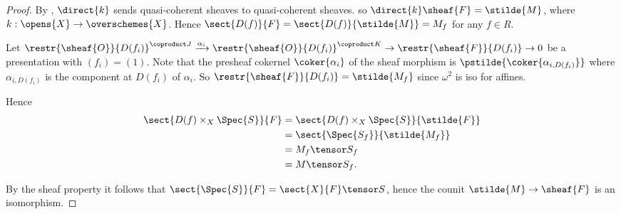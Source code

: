 \begin{proof}
By , $\direct{k}$ sends quasi-coherent sheaves to quasi-coherent sheaves.
so $\direct{k}\sheaf{F} = \stilde{M}$,
where $k:\opens{X} \rightarrow \overschemes{X}$.
Hence $\sect{D(f)}{F} = \sect{D(f)}{\stilde{M}} = M_f$ 
for any $f\in R$.

Let 
$\restr{\sheaf{O}}{D(f_i)}^{\coproduct J} \xrightarrow{\alpha_i} \restr{\sheaf{O}}{D(f_i)}^{\coproduct K} \rightarrow \restr{\sheaf{F}}{D(f_i)} \rightarrow 0$ be a presentation with $(f_i) = (1)$.
Note that the presheaf cokernel $\coker{\alpha_i}$ of the sheaf morphism is
$\pstilde{\coker{\alpha_{i,D(f_i)}}}$ where $\alpha_{i,D(f_i)}$ is the component at $D(f_i)$ of $\alpha_i$.
So $\restr{\sheaf{F}}{D(f_i)} = \stilde{M_f}$ since $\omega^2$ is iso for affines.

Hence 
\begin{align*}
\sect{D(f) \times_X \Spec{S}}{F} &= \sect{D(f) \times_X \Spec{S}}{\stilde{F}}\\
&= \sect{\Spec{S_f}}{\stilde{M_f}} \\ 
&= M_f \tensor S_f\\
& = M \tensor S_f.
\end{align*}

By the sheaf property it follows that $\sect{\Spec{S}}{F} = \sect{X}{F} \tensor S$,
hence the counit $\stilde{M} \rightarrow \sheaf{F}$ is an isomorphism.
\end{proof}